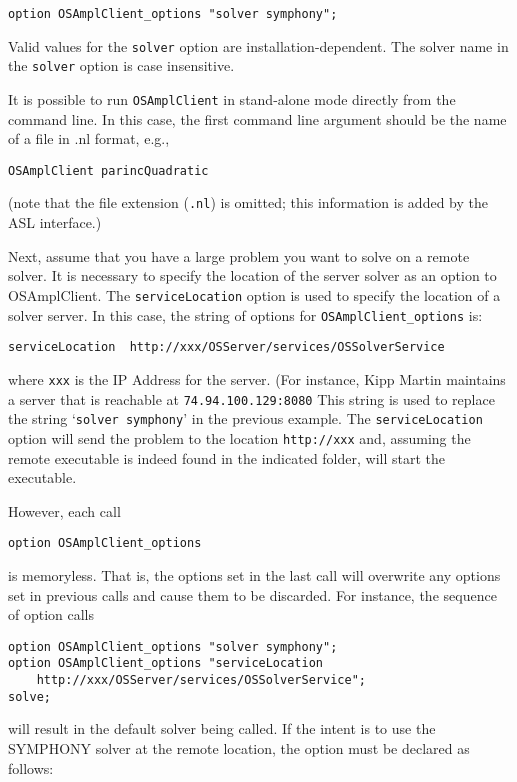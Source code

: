 \begin{verbatim}
option OSAmplClient_options "solver symphony";
\end{verbatim}

Valid values for the {\tt solver} option are installation-dependent.
The solver name in the {\tt solver} option is case insensitive.  

\ifbible
\medskip
It is possible to run {\tt OSAmplClient} in stand-alone mode directly from the command line. In this case, the first command line argument should be the name of a file in .nl format, e.g.,

\begin{verbatim}
OSAmplClient parincQuadratic
\end{verbatim}

\noindent (note that the file extension ({\tt .nl}) is omitted; this information is added by the ASL interface.)
\fi

\label{section:remoteampl}

Next, assume that you have a large problem you want to solve on a remote solver. It is necessary 
to specify the location of the server solver as an option to OSAmplClient. 
The {\tt serviceLocation} option is used to specify the location of a solver server. 
In this case, the string of options for {\tt OSAmplClient\_options} is:

\begin{verbatim}
serviceLocation  http://xxx/OSServer/services/OSSolverService
\end{verbatim}
where {\tt xxx} is the IP Address for the server. (For instance, Kipp Martin maintains a server that is reachable  at {\tt 74.94.100.129:8080} This string is used to replace the string `{\tt solver symphony}' in the previous example. 
The {\tt serviceLocation} option will send the problem to the %
location {\tt http://xxx} and, assuming the remote executable is indeed found 
in the indicated folder, will start the executable.  


\medskip


However, each call 
\begin{verbatim}
option OSAmplClient_options
\end{verbatim}
is memoryless. That is, the options set in the last call will overwrite any options set in previous calls
and cause them to be discarded.  For instance, the sequence of option calls
\begin{verbatim}
option OSAmplClient_options "solver symphony";
option OSAmplClient_options "serviceLocation  
    http://xxx/OSServer/services/OSSolverService";
solve;
\end{verbatim}
will result in the default solver being called. 
If the intent is to use the SYMPHONY solver at the remote location, the option must be declared
as follows:

